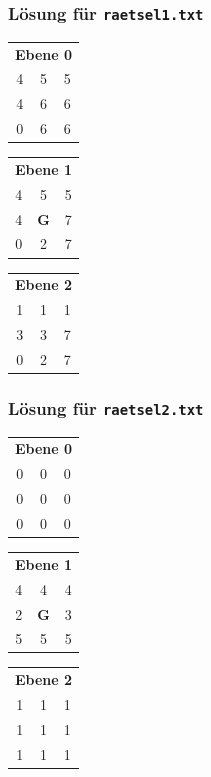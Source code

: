 \documentclass[11pt,a4paper,parskip=half]{scrartcl}
\newcommand{\gold}{\cellcolor{goldcol}\textbf{G}}
\newcommand{\file}[1]{\texttt{#1}}
\begin{document}
\subsubsection*{Lösung für \file{raetsel1.txt}}

\begin{center}\footnotesize\setlength{\tabcolsep}{3pt}
\begin{tabular}[t]{@{}ccc@{}}
\multicolumn{3}{c}{\textbf{Ebene 0}}\\
4 & 5 & 5\\
4 & 6 & 6\\
0 & 6 & 6\\
\end{tabular}\hspace{0.9em}
\begin{tabular}[t]{@{}ccc@{}}
\multicolumn{3}{c}{\textbf{Ebene 1}}\\
4 & 5 & 5\\
4 & \gold & 7\\
0 & 2 & 7\\
\end{tabular}\hspace{0.9em}
\begin{tabular}[t]{@{}ccc@{}}
\multicolumn{3}{c}{\textbf{Ebene 2}}\\
1 & 1 & 1\\
3 & 3 & 7\\
0 & 2 & 7\\
\end{tabular}\hspace{0.9em}
\end{center}

\subsubsection*{Lösung für \file{raetsel2.txt}}

\begin{center}\footnotesize\setlength{\tabcolsep}{3pt}
\begin{tabular}[t]{@{}ccc@{}}
\multicolumn{3}{c}{\textbf{Ebene 0}}\\
0 & 0 & 0\\
0 & 0 & 0\\
0 & 0 & 0\\
\end{tabular}\hspace{0.9em}
\begin{tabular}[t]{@{}ccc@{}}
\multicolumn{3}{c}{\textbf{Ebene 1}}\\
4 & 4 & 4\\
2 & \gold & 3\\
5 & 5 & 5\\
\end{tabular}\hspace{0.9em}
\begin{tabular}[t]{@{}ccc@{}}
\multicolumn{3}{c}{\textbf{Ebene 2}}\\
1 & 1 & 1\\
1 & 1 & 1\\
1 & 1 & 1\\
\end{tabular}\hspace{0.9em}
\end{center}
\end{document}
